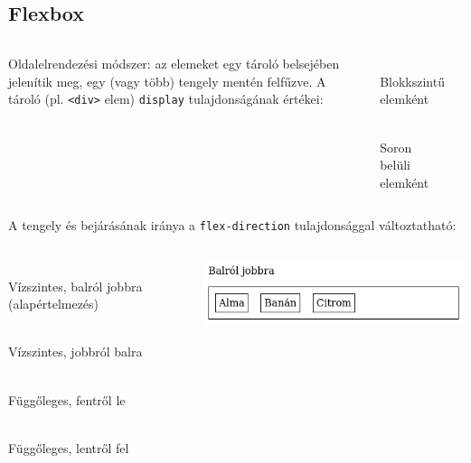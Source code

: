 \subsection{Flexbox}

%
\begin{frame}
  \begin{columns}
      Oldalelrendezési módszer: az elemeket egy tároló belsejében jelenítik meg, egy (vagy több) tengely mentén felfűzve. A tároló (pl. \texttt{<div>} elem) \texttt{display} tulajdonságának értékei:
      \begin{description}[m]
        \item[\texttt{flex}] \hfill \\ Blokkszintű elemként
        \item[\texttt{inline-flex}] \hfill \\ Soron belüli elemként
      \end{description}
      \begin{exampleblock}{}
        \scriptsize
        
      \end{exampleblock}
  \end{columns}
\end{frame}

%
\begin{frame}
  A tengely és bejárásának iránya a \texttt{flex-direction} tulajdonsággal változtatható:
  \begin{columns}
      \begin{description}[m]
        \item[\texttt{row}] \hfill \\ Vízszintes, balról jobbra (alapértelmezés)
        \item[\texttt{row-reverse}] \hfill \\ Vízszintes, jobbról balra
        \item[\texttt{column}] \hfill \\ Függőleges, fentről le
        \item[\texttt{column-reverse}] \hfill \\ Függőleges, lentről fel
      \end{description}
      \begin{exampleblock}{}
        \scriptsize
        
      \end{exampleblock}
      \includegraphics[width=\textwidth]{flex-direction-row.png}
  \end{columns}
\end{frame}

